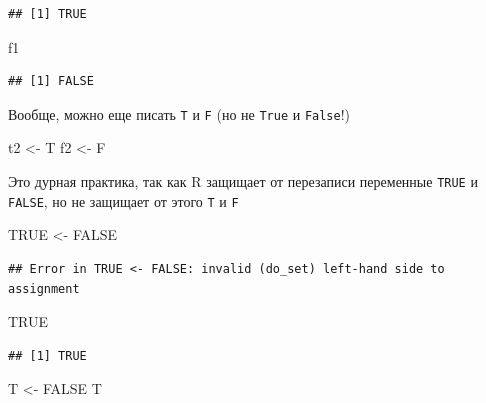 \documentclass[]{book}
\newenvironment{Shaded}{\begin{snugshade}}{\end{snugshade}}
\newcommand{\NormalTok}[1]{#1}
\newcommand{\OtherTok}[1]{\textcolor[rgb]{0.56,0.35,0.01}{#1}}
\newcommand{\StringTok}[1]{\textcolor[rgb]{0.31,0.60,0.02}{#1}}
\begin{document}
\begin{verbatim}
## [1] TRUE
\end{verbatim}

\begin{Shaded}
\begin{Highlighting}[]
\NormalTok{f1}
\end{Highlighting}
\end{Shaded}

\begin{verbatim}
## [1] FALSE
\end{verbatim}

Вообще, можно еще писать \texttt{T} и \texttt{F} (но не \texttt{True} и \texttt{False}!)

\begin{Shaded}
\begin{Highlighting}[]
\NormalTok{t2 <-}\StringTok{ }\NormalTok{T}
\NormalTok{f2 <-}\StringTok{ }\NormalTok{F}
\end{Highlighting}
\end{Shaded}

Это дурная практика, так как R защищает от перезаписи переменные \texttt{TRUE} и \texttt{FALSE}, но не защищает от этого \texttt{T} и \texttt{F}

\begin{Shaded}
\begin{Highlighting}[]
\OtherTok{TRUE}\NormalTok{ <-}\StringTok{ }\OtherTok{FALSE}
\end{Highlighting}
\end{Shaded}

\begin{verbatim}
## Error in TRUE <- FALSE: invalid (do_set) left-hand side to assignment
\end{verbatim}

\begin{Shaded}
\begin{Highlighting}[]
\OtherTok{TRUE}
\end{Highlighting}
\end{Shaded}

\begin{verbatim}
## [1] TRUE
\end{verbatim}

\begin{Shaded}
\begin{Highlighting}[]
\NormalTok{T <-}\StringTok{ }\OtherTok{FALSE}
\NormalTok{T}
\end{Highlighting}
\end{Shaded}
\end{document}

